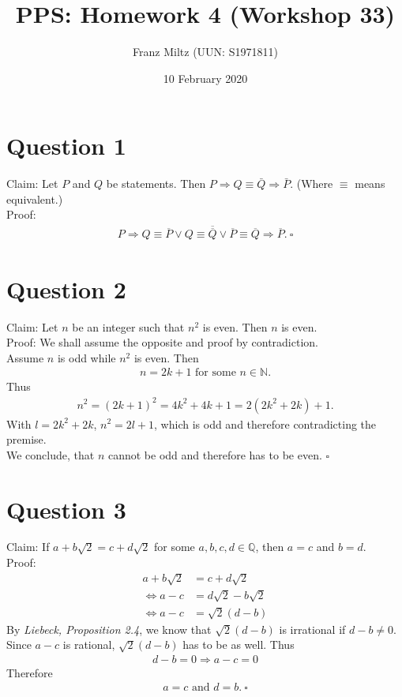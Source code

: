 \documentclass{article}
\title{PPS: Homework 4 (Workshop 33)}
\author{Franz Miltz (UUN: S1971811)}
\date{10 February 2020}
\begin{document}
\maketitle
\section*{Question 1}
Claim: Let $P$ and $Q$ be statements. Then $P\Rightarrow Q\equiv \bar{Q}\Rightarrow \bar{P}$. (Where $\equiv$ means equivalent.)\\
Proof:
\begin{align*}
  P\Rightarrow Q\equiv\overline{P}\vee Q\equiv \overline{\overline{Q}}\vee \overline{P}\equiv\overline{Q}\Rightarrow\overline{P}.\:\square
\end{align*}
\section*{Question 2}
Claim: Let $n$ be an integer such that $n^2$ is even. Then $n$ is even.\\
Proof: We shall assume the opposite and proof by contradiction.\\
Assume $n$ is odd while $n^2$ is even. Then
\begin{align*}
  n=2k+1 \text{ for some } n\in\mathbb{N}.
\end{align*}
Thus
\begin{align*}
  n^2=(2k+1)^2=4k^2+4k+1=2(2k^2+2k)+1.
\end{align*}
With $l=2k^2+2k$, $n^2=2l+1$, which is odd and therefore contradicting the premise.\\
We conclude, that $n$ cannot be odd and therefore has to be even. $\square$
\section*{Question 3}
Claim: If $a+b\sqrt{2}=c+d\sqrt{2}$ for some $a,b,c,d\in\mathbb{Q}$, then $a=c$ and $b=d$.\\
Proof:
\begin{align*}
  a+b\sqrt{2}         & =c+d\sqrt{2}         \\
  \Leftrightarrow a-c & =d\sqrt{2}-b\sqrt{2} \\
  \Leftrightarrow a-c & =\sqrt{2}(d-b)
\end{align*}
By \emph{Liebeck, Proposition 2.4}, we know that $\sqrt{2}(d-b)$ is irrational if $d-b\not=0$. Since $a-c$ is rational, $\sqrt{2}(d-b)$ has to be as well. Thus
\begin{align*}
  d-b=0 \Rightarrow a-c=0
\end{align*}
Therefore
\begin{align*}
  a=c \text{ and } d=b.\:\square
\end{align*}
\end{document}
